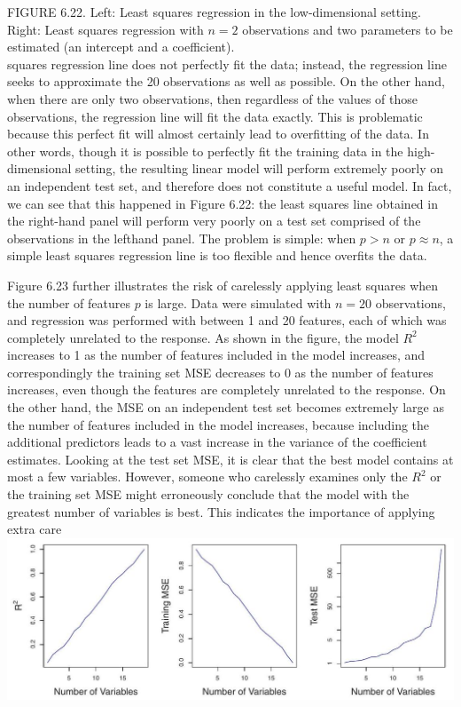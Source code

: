 \documentclass[10pt]{article}
\begin{document}
FIGURE 6.22. Left: Least squares regression in the low-dimensional setting. Right: Least squares regression with $n=2$ observations and two parameters to be estimated (an intercept and a coefficient).\\
squares regression line does not perfectly fit the data; instead, the regression line seeks to approximate the 20 observations as well as possible. On the other hand, when there are only two observations, then regardless of the values of those observations, the regression line will fit the data exactly. This is problematic because this perfect fit will almost certainly lead to overfitting of the data. In other words, though it is possible to perfectly fit the training data in the high-dimensional setting, the resulting linear model will perform extremely poorly on an independent test set, and therefore does not constitute a useful model. In fact, we can see that this happened in Figure 6.22: the least squares line obtained in the right-hand panel will perform very poorly on a test set comprised of the observations in the lefthand panel. The problem is simple: when $p>n$ or $p \approx n$, a simple least squares regression line is too flexible and hence overfits the data.

Figure 6.23 further illustrates the risk of carelessly applying least squares when the number of features $p$ is large. Data were simulated with $n=20$ observations, and regression was performed with between 1 and 20 features, each of which was completely unrelated to the response. As shown in the figure, the model $R^{2}$ increases to 1 as the number of features included in the model increases, and correspondingly the training set MSE decreases to 0 as the number of features increases, even though the features are completely unrelated to the response. On the other hand, the MSE on an independent test set becomes extremely large as the number of features included in the model increases, because including the additional predictors leads to a vast increase in the variance of the coefficient estimates. Looking at the test set MSE, it is clear that the best model contains at most a few variables. However, someone who carelessly examines only the $R^{2}$ or the training set MSE might erroneously conclude that the model with the greatest number of variables is best. This indicates the importance of applying extra care\\
\includegraphics[max width=\textwidth, center]{2025_05_05_efe77898333945044de4g-256}
\end{document}
